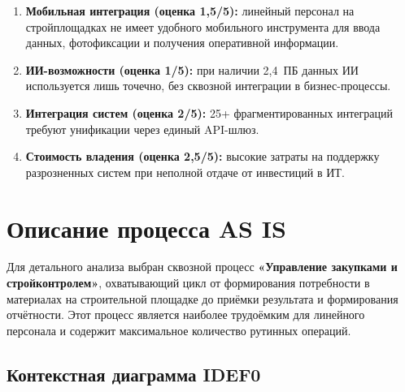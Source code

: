\documentclass[12pt,a4paper]{article}
\begin{document}
\begin{enumerate}[leftmargin=20pt]
  \item \textbf{Мобильная интеграция (оценка 1,5/5):} линейный персонал на стройплощадках не имеет удобного мобильного инструмента для ввода данных, фотофиксации и получения оперативной информации.
  \item \textbf{ИИ-возможности (оценка 1/5):} при наличии 2,4~ПБ данных ИИ используется лишь точечно, без сквозной интеграции в бизнес-процессы.
  \item \textbf{Интеграция систем (оценка 2/5):} 25+ фрагментированных интеграций требуют унификации через единый API-шлюз.
  \item \textbf{Стоимость владения (оценка 2,5/5):} высокие затраты на поддержку разрозненных систем при неполной отдаче от инвестиций в ИТ.
\end{enumerate}

\newpage

\section{Описание процесса AS IS}

Для детального анализа выбран сквозной процесс \textbf{«Управление закупками и стройконтролем»}, охватывающий цикл от формирования потребности в материалах на строительной площадке до приёмки результата и формирования отчётности. Этот процесс является наиболее трудоёмким для линейного персонала и содержит максимальное количество рутинных операций.

\subsection{Контекстная диаграмма IDEF0}
\end{document}

